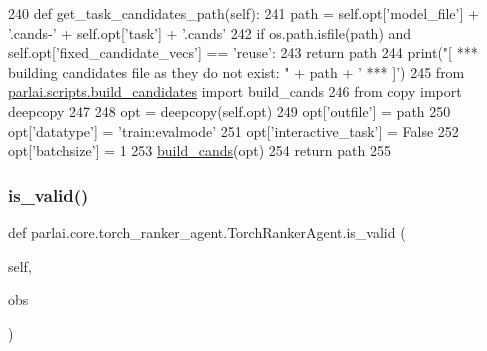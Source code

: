 \begin{DoxyCode}
240     \textcolor{keyword}{def }get\_task\_candidates\_path(self):
241         path = self.opt[\textcolor{stringliteral}{'model\_file'}] + \textcolor{stringliteral}{'.cands-'} + self.opt[\textcolor{stringliteral}{'task'}] + \textcolor{stringliteral}{'.cands'}
242         \textcolor{keywordflow}{if} os.path.isfile(path) \textcolor{keywordflow}{and} self.opt[\textcolor{stringliteral}{'fixed\_candidate\_vecs'}] == \textcolor{stringliteral}{'reuse'}:
243             \textcolor{keywordflow}{return} path
244         print(\textcolor{stringliteral}{"[ *** building candidates file as they do not exist: "} + path + \textcolor{stringliteral}{' *** ]'})
245         \textcolor{keyword}{from} \hyperlink{namespaceparlai_1_1scripts_1_1build__candidates}{parlai.scripts.build\_candidates} \textcolor{keyword}{import} build\_cands
246         \textcolor{keyword}{from} copy \textcolor{keyword}{import} deepcopy
247 
248         opt = deepcopy(self.opt)
249         opt[\textcolor{stringliteral}{'outfile'}] = path
250         opt[\textcolor{stringliteral}{'datatype'}] = \textcolor{stringliteral}{'train:evalmode'}
251         opt[\textcolor{stringliteral}{'interactive\_task'}] = \textcolor{keyword}{False}
252         opt[\textcolor{stringliteral}{'batchsize'}] = 1
253         \hyperlink{namespaceparlai_1_1agents_1_1legacy__agents_1_1memnn_1_1memnn__v0_ab07fdb540c02e8e2a1cc7e8cf662a8b8}{build\_cands}(opt)
254         \textcolor{keywordflow}{return} path
255 
\end{DoxyCode}
\mbox{\label{classparlai_1_1core_1_1torch__ranker__agent_1_1TorchRankerAgent_a3a80c3eb68b019859da2a83706c3844d}} 
\subsubsection{\texorpdfstring{is\+\_\+valid()}{is\_valid()}}
{\footnotesize\ttfamily def parlai.\+core.\+torch\+\_\+ranker\+\_\+agent.\+Torch\+Ranker\+Agent.\+is\+\_\+valid (\begin{DoxyParamCaption}\item[{}]{self,  }\item[{}]{obs }\end{DoxyParamCaption})}

